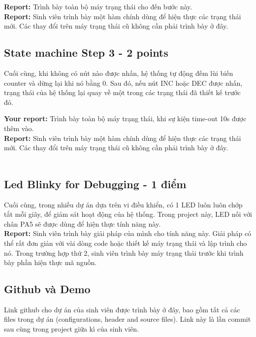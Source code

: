 \textbf{Report: } Trình bày toàn bộ máy trạng thái cho đến bước này.\\

\textbf{Report: } Sinh viên trình bày một hàm chính dùng để hiện thực các trạng thái mới. Các thay đổi trên máy trạng thái cũ không cần phải trình bày ở đây.\\


\subsection{State machine Step 3 - 2 points}
Cuối cùng, khi không có nút nào được nhấn, hệ thống tự động đếm lùi biến counter và dừng lại khi nó bằng 0. Sau đó, nếu nút INC  hoặc DEC được nhấn, trạng thái của hệ thống lại quay về một trong các trạng thái đã thiết kế trước đó.

\textbf{Your report: } Trình bày toàn bộ máy trạng thái, khi sự kiện time-out 10s được thêm vào.\\

\textbf{Report: } Sinh viên trình bày một hàm chính dùng để hiện thực các trạng thái mới. Các thay đổi trên máy trạng thái cũ không cần phải trình bày ở đây.\\\

\subsection{Led Blinky for Debugging - 1 điểm}


Cuối cùng, trong nhiều dự án dựa trên vi điều khiển, có 1 LED luôn luôn chớp tắt mỗi giây, để giám sát hoạt động của hệ thống. Trong project này, LED nối với chân PA5 sẽ được dùng để hiện thực tính năng này.\\

\textbf{Report: } Sinh viên trình bày giải pháp của mình cho tính năng này. Giải pháp có thể rất đơn giản với vài dòng code hoặc thiết kế máy trạng thái và lập trình cho nó. Trong trường hợp thứ 2, sinh viên trình bày máy trạng thái trước khi trình bày phần hiện thực mã nguồn.

\subsection{Github và Demo}

Link github cho dự án của sinh viên được trình bày ở đây, bao gồm tất cả các files trong dự án (configurations, header and source files). Link này là lần commit sau cùng trong project giữa kì của sinh viên.\\



